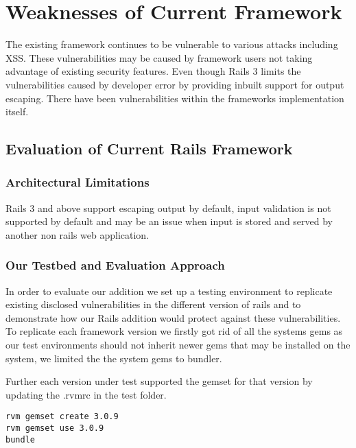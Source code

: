 \documentclass[10pt, conference, compsocconf]{IEEEtran}
\begin{document}
\section{Weaknesses of Current Framework} %
\label{sec:weaknesses_of_current_framework}
The existing framework continues to be vulnerable to various attacks including XSS. These vulnerabilities may be caused by framework users not taking advantage of existing security features. Even though Rails 3 limits the vulnerabilities caused by developer error by providing inbuilt support for output escaping. There have been vulnerabilities within the frameworks implementation itself.

\subsection{Evaluation of Current Rails Framework} %
\label{sub:evaluation_of_current_rails_framework}

\subsubsection{Architectural Limitations} %
\label{ssub:architectural_limitations}
Rails 3 and above support escaping output by default, input validation is not supported by default and may be an issue when input is stored and served by another non rails web application.

\subsubsection{Our Testbed and Evaluation Approach} %
\label{ssub:our_testbed_and_evaluation_approach}
In order to evaluate our addition we set up a testing environment to replicate existing disclosed vulnerabilities in the different version of rails and to demonstrate how our Rails addition would protect against these vulnerabilities. To replicate each framework version we firstly got rid of all the systems gems as our test environments should not inherit newer gems that may be installed on the system, we limited the the system gems to bundler. 

Further each version under test supported the gemset for that version by updating the .rvmrc in the test folder.

\begin{lstlisting}
rvm gemset create 3.0.9
rvm gemset use 3.0.9
bundle	
\end{lstlisting}
\end{document}
